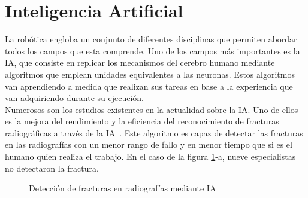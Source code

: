 \section{Inteligencia Artificial}
La robótica engloba un conjunto de diferentes disciplinas que permiten abordar todos los campos que esta comprende. Uno de los campos más importantes es la IA, que consiste en replicar los mecanismos del cerebro humano mediante algoritmos que emplean unidades equivalentes a las neuronas. Estos algoritmos van aprendiendo a medida que realizan sus tareas en base a la experiencia que van adquiriendo durante su ejecución.\\

Numerosos son los estudios existentes en la actualidad sobre la IA. Uno de ellos es la mejora del rendimiento y la eficiencia  del reconocimiento de fracturas radiográficas a través de la IA~\cite{guermazi21}. Este algoritmo es capaz de detectar las fracturas en las radiografías con un menor rango de fallo y en menor tiempo que si es el humano quien realiza el trabajo. En el caso de la figura \ref{fig:rads}-a, nueve especialistas no detectaron la fractura, 
\begin{figure}[h!]
  \begin{center}
    \hspace{2mm}
  \end{center}
\caption{Detección de fracturas en radiografías mediante IA} \label{fig:rads}
\end{figure}\\

